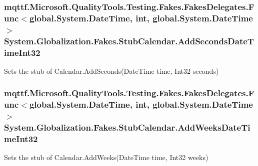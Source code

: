 \hypertarget{class_system_1_1_globalization_1_1_fakes_1_1_stub_calendar_a37ec1885128ab99c9da88e0bad2ece23}{
\subsubsection[{Add\-Seconds\-Date\-Time\-Int32}]{\setlength{\rightskip}{0pt plus 5cm}mqttf.\-Microsoft.\-Quality\-Tools.\-Testing.\-Fakes.\-Fakes\-Delegates.\-Func$<$global.\-System.\-Date\-Time, int, global.\-System.\-Date\-Time$>$ System.\-Globalization.\-Fakes.\-Stub\-Calendar.\-Add\-Seconds\-Date\-Time\-Int32}}\label{class_system_1_1_globalization_1_1_fakes_1_1_stub_calendar_a37ec1885128ab99c9da88e0bad2ece23}


Sets the stub of Calendar.\-Add\-Seconds(\-Date\-Time time, Int32 seconds)

\hypertarget{class_system_1_1_globalization_1_1_fakes_1_1_stub_calendar_a9c917e3039c6ab15f63ee0f253ef3377}{
\subsubsection[{Add\-Weeks\-Date\-Time\-Int32}]{\setlength{\rightskip}{0pt plus 5cm}mqttf.\-Microsoft.\-Quality\-Tools.\-Testing.\-Fakes.\-Fakes\-Delegates.\-Func$<$global.\-System.\-Date\-Time, int, global.\-System.\-Date\-Time$>$ System.\-Globalization.\-Fakes.\-Stub\-Calendar.\-Add\-Weeks\-Date\-Time\-Int32}}\label{class_system_1_1_globalization_1_1_fakes_1_1_stub_calendar_a9c917e3039c6ab15f63ee0f253ef3377}


Sets the stub of Calendar.\-Add\-Weeks(\-Date\-Time time, Int32 weeks)

